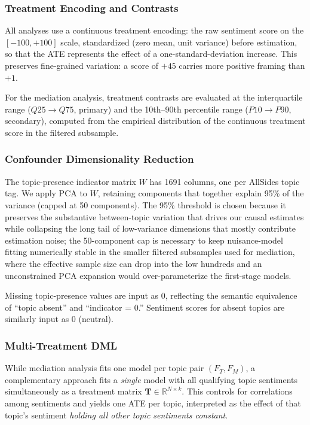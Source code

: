 \subsubsection{Treatment Encoding and Contrasts}
\label{sec:treatment-encoding}

All analyses use a continuous treatment encoding: the raw sentiment score on the $[-100, +100]$ scale, standardized (zero mean, unit variance) before estimation, so that the ATE represents the effect of a one-standard-deviation increase. This preserves fine-grained variation: a score of $+45$ carries more positive framing than $+1$.

For the mediation analysis, treatment contrasts are evaluated at the interquartile range ($Q25 \to Q75$, primary) and the 10th--90th percentile range ($P10 \to P90$, secondary), computed from the empirical distribution of the continuous treatment score in the filtered subsample.
\subsubsection{Confounder Dimensionality Reduction}
\label{sec:pca}

The topic-presence indicator matrix $W$ has \num{1691} columns, one per AllSides topic tag. We apply PCA to $W$, retaining components that together explain 95\% of the variance (capped at 50 components). The 95\% threshold is chosen because it preserves the substantive between-topic variation that drives our causal estimates while collapsing the long tail of low-variance dimensions that mostly contribute estimation noise; the 50-component cap is necessary to keep nuisance-model fitting numerically stable in the smaller filtered subsamples used for mediation, where the effective sample size can drop into the low hundreds and an unconstrained PCA expansion would over-parameterize the first-stage models.

Missing topic-presence values are input as 0, reflecting the semantic equivalence of ``topic absent'' and ``indicator = 0.'' Sentiment scores for absent topics are similarly input as 0 (neutral).

\subsubsection{Multi-Treatment DML}
\label{sec:multi-treatment-design}

While mediation analysis fits one model per topic pair $(F_T, F_M)$, a complementary approach fits a \emph{single} model with all qualifying topic sentiments simultaneously as a treatment matrix $\mathbf{T} \in \mathbb{R}^{N \times k}$. This controls for correlations among sentiments and yields one ATE per topic, interpreted as the effect of that topic's sentiment \emph{holding all other topic sentiments constant}.


